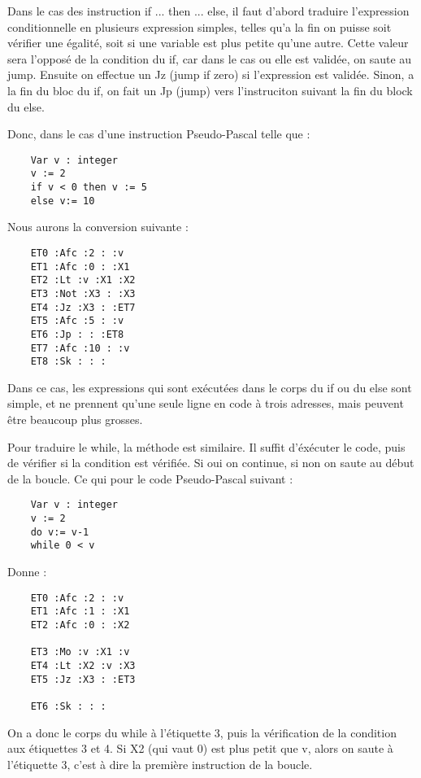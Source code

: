 \documentclass{article}
\begin{document}
Dans le cas des instruction if ... then ... else, il faut d'abord traduire l'expression conditionnelle en plusieurs expression simples, telles qu'a la fin on puisse soit vérifier une égalité, soit si une variable est plus petite qu'une autre.
Cette valeur sera l'opposé de la condition du if, car dans le cas ou elle est validée, on saute au jump. Ensuite on effectue un Jz (jump if zero) si l'expression est validée.
Sinon, a la fin du bloc du if, on fait un Jp (jump) vers l'instruciton suivant la fin du block du else.

Donc, dans le cas d'une instruction Pseudo-Pascal telle que :
\begin{lstlisting}
    Var v : integer
    v := 2
    if v < 0 then v := 5
    else v:= 10
\end{lstlisting}

Nous aurons la conversion suivante :

\begin{lstlisting}
    ET0 :Afc :2 : :v
    ET1 :Afc :0 : :X1
    ET2 :Lt :v :X1 :X2
    ET3 :Not :X3 : :X3
    ET4 :Jz :X3 : :ET7
    ET5 :Afc :5 : :v
    ET6 :Jp : : :ET8
    ET7 :Afc :10 : :v
    ET8 :Sk : : :
\end{lstlisting}

Dans ce cas, les expressions qui sont exécutées dans le corps du if ou du else sont simple, et ne prennent qu'une seule ligne en code à trois adresses, mais peuvent être beaucoup plus grosses.

\bigbreak

Pour traduire le while, la méthode est similaire. Il suffit d'éxécuter le code, puis de vérifier si la condition est vérifiée. Si oui on continue, si non on saute au début de la boucle. Ce qui pour le code Pseudo-Pascal suivant :

\begin{lstlisting}
    Var v : integer
    v := 2
    do v:= v-1
    while 0 < v
\end{lstlisting}

Donne :

\begin{lstlisting}
    ET0 :Afc :2 : :v
    ET1 :Afc :1 : :X1
    ET2 :Afc :0 : :X2

    ET3 :Mo :v :X1 :v
    ET4 :Lt :X2 :v :X3
    ET5 :Jz :X3 : :ET3

    ET6 :Sk : : :
\end{lstlisting}

On a donc le corps du while à l'étiquette 3, puis la vérification de la condition aux étiquettes 3 et 4. Si X2 (qui vaut 0) est plus petit que v, alors on saute à l'étiquette 3, c'est à dire la première instruction de la boucle.
\end{document}
